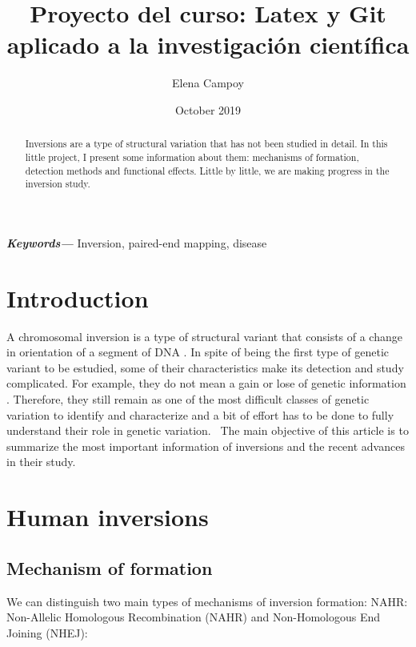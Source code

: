 \documentclass{article}
\title{Proyecto del curso: Latex y Git aplicado a la investigación científica}
\author{Elena Campoy}
\date{October 2019}
\providecommand{\keywords}[1]
{
  \small	
  \textbf{\textit{Keywords---}} #1
}
\begin{document}
\maketitle

\begin{abstract}
Inversions are a type of structural variation that has not been studied in detail. In this little project, I present some information about them: mechanisms of formation, detection methods and functional effects. Little by little, we are making progress in the inversion study.
\end{abstract}

\keywords{Inversion, paired-end mapping, disease}

\section{Introduction}
A chromosomal inversion is a type of structural variant that consists of a change in orientation of a segment of DNA \cite{puig_human_2015, giner-delgado_evolutionary_2019}. In spite of being the first type of genetic variant to be estudied, some of their characteristics make its detection and study complicated. For example, they do not mean a gain or lose of genetic information \cite{giner-delgado_evolutionary_2019}. Therefore, they still remain as one of the most difficult classes of genetic variation to identify and characterize \cite{puig_determining_2019} and a bit of effort has to be done to fully understand their role in genetic variation. 
\
The main objective of this article is to summarize the most important information of inversions and the recent advances in their study. 
\section{Human inversions}

\subsection{Mechanism of formation}
We can distinguish two main types of mechanisms of inversion formation: NAHR: Non-Allelic Homologous Recombination (NAHR) and Non-Homologous End Joining (NHEJ):
\end{document}
